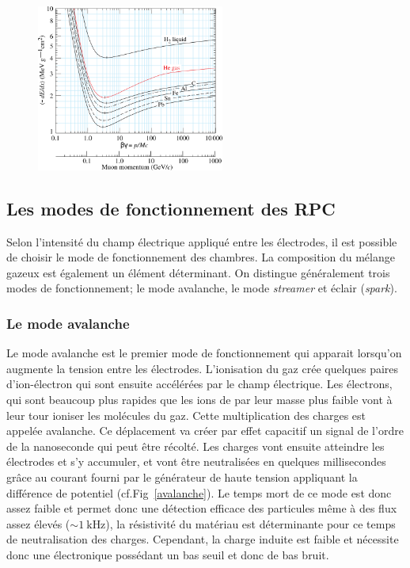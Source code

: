 \begin{figure}[ht!]
	\centering
	\includegraphics[width=0.55\textwidth]{RPC/energylost.png}
	\label{mat}
\end{figure}

\subsection{Les modes de fonctionnement des RPC}

Selon l'intensité du champ électrique appliqué entre les électrodes, il est possible de choisir le mode de fonctionnement des chambres. La composition du mélange gazeux est également un élément déterminant. On distingue généralement trois modes de fonctionnement; le mode avalanche, le mode \textit{streamer} et éclair (\textit{spark}).

\subsubsection{Le mode avalanche}

Le mode avalanche est le premier mode de fonctionnement qui apparait lorsqu'on augmente la tension entre les électrodes. L'ionisation du gaz crée quelques paires d'ion-électron qui sont ensuite accélérées par le champ électrique. Les électrons, qui sont beaucoup plus rapides que les ions de par leur masse plus faible vont à leur tour ioniser les molécules du gaz. Cette multiplication des charges est appelée avalanche. Ce déplacement va créer par effet capacitif un signal de l'ordre de la nanoseconde qui peut être récolté. Les charges vont ensuite atteindre les électrodes et s'y accumuler, et vont être neutralisées en quelques millisecondes grâce au courant fourni par le générateur de haute tension appliquant la différence de potentiel (cf.Fig~\ref{avalanche}). Le temps mort de ce mode est donc assez faible et permet donc une détection efficace des particules même à des flux assez élevés ($\sim\SI{1}{\kilo\hertz}$), la résistivité du matériau est déterminante pour ce temps de neutralisation des charges. Cependant, la charge induite est faible et nécessite donc une électronique possédant un bas seuil et donc de bas bruit.

